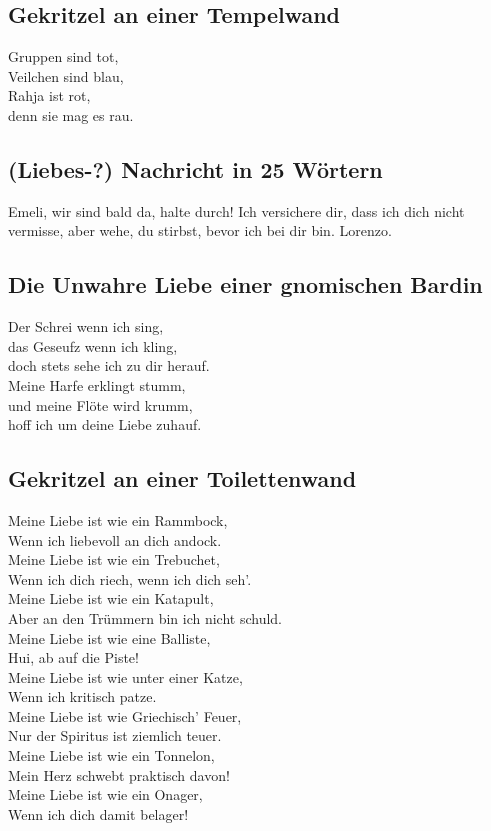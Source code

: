 \documentclass[final]{multiversum}
\begin{document}
\subsection{Gekritzel an einer Tempelwand}
Gruppen sind tot,\\
Veilchen sind blau,\\
Rahja ist rot,\\
denn sie mag es rau.

\subsection{(Liebes-?) Nachricht in 25 Wörtern}
Emeli, wir sind bald da, halte durch! Ich versichere dir, dass ich dich nicht vermisse, aber wehe, du stirbst, bevor ich bei dir bin. Lorenzo.

\subsection{Die Unwahre Liebe einer gnomischen Bardin}
\begin{center}
      Der Schrei wenn ich sing,\\
      das Geseufz wenn ich kling,\\
      doch stets sehe ich zu dir herauf.\\
      Meine Harfe erklingt stumm,\\
      und meine Flöte wird krumm,\\
      hoff ich um deine Liebe zuhauf.
\end{center}

\subsection{Gekritzel an einer Toilettenwand}
Meine Liebe ist wie ein Rammbock,\\
Wenn ich liebevoll an dich andock.\\
Meine Liebe ist wie ein Trebuchet,\\
Wenn ich dich riech, wenn ich dich seh'.\\
Meine Liebe ist wie ein Katapult,\\
Aber an den Trümmern bin ich nicht schuld.\\
Meine Liebe ist wie eine Balliste,\\
Hui, ab auf die Piste!\\
Meine Liebe ist wie unter einer Katze,\\
Wenn ich kritisch patze.\\
Meine Liebe ist wie Griechisch' Feuer,\\
Nur der Spiritus ist ziemlich teuer.\\
Meine Liebe ist wie ein Tonnelon,\\
Mein Herz schwebt praktisch davon!\\
Meine Liebe ist wie ein Onager,\\
Wenn ich dich damit belager!
\end{document}

